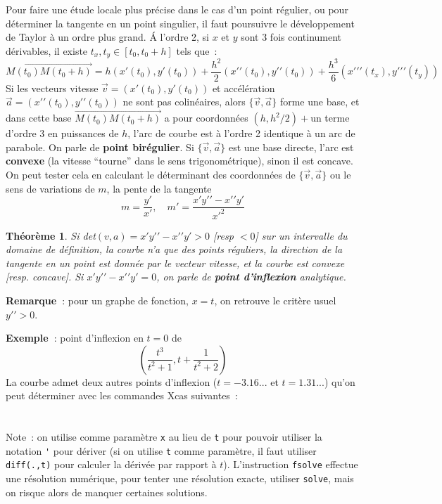 \documentclass[a4paper,11pt]{article}
\newtheorem{thm}{Théorème}
\begin{document}
\begin{giacjshere}
Pour faire une \'etude locale plus pr\'ecise dans le cas d'un point
r\'egulier, ou pour d\'eterminer la tangente en un point singulier,
il faut poursuivre le d\'eveloppement de Taylor \`a un ordre plus
grand. \'A l'ordre 2, si $x$ et $y$ sont 3 fois continument
d\'erivables, il existe $t_x,t_y\in [t_0,t_0+h]$ tels que~:
$$\overrightarrow{M(t_0)M(t_0+h)}= 
h (x'(t_0),y'(t_0))+\frac{h^2}{2}(x'{'}(t_0),y'{'}(t_0))
+\frac{h^3}{6}(x'{'}'(t_x),y'{'}'(t_y))
$$
Si les vecteurs vitesse $\overrightarrow{v}=(x'(t_0),y'(t_0))$
et acc\'el\'eration $\overrightarrow{a}=(x'{'}(t_0),y'{'}(t_0))$
ne sont pas colin\'eaires, 
alors $\{\overrightarrow{v},\overrightarrow{a}\}$ forme 
une base, et dans cette base $\overrightarrow{M(t_0)M(t_0+h)}$
a pour coordonn\'ees $(h,h^2/2)+$un terme d'ordre 3 en puissances de $h$, l'arc
de courbe est \`a l'ordre 2 identique \`a un arc de parabole. 
On parle de {\bf point bir\'egulier}.
Si $\{\overrightarrow{v},\overrightarrow{a}\}$ est une base directe,
l'arc est {\bf convexe} (la vitesse
``tourne'' dans le sens trigonom\'etrique),
sinon il est concave. On peut tester cela en calculant
le d\'eterminant des coordonn\'ees de 
$\{\overrightarrow{v},\overrightarrow{a}\}$ ou le sens
de variations de $m$, la pente de la tangente 
\[ m=\frac{y'}{x'}, \quad m'=\frac{x'y'{'}-x'{'}y'}{x'^2} \]

\begin{thm}
Si det$(v,a)=x'y'{'}-x'{'}y'>0$ [resp $<0$] 
sur un intervalle du domaine de d\'efinition,
la courbe n'a que des points r\'eguliers, 
la direction de la tangente en un point
est donn\'ee par le vecteur vitesse, et la courbe est convexe
[resp. concave].
Si $x'y'{'}-x'{'}y'=0$, on parle de 
{\bf point d'inflexion} analytique.
\end{thm}
{\bf Remarque~}: pour un graphe de fonction, $x=t$, on retrouve le
crit\`ere usuel $y'{'}>0$.

{\bf Exemple~}: point d'inflexion en $t=0$ de
$$ (\frac{t^3}{t^2+1},t+\frac{1}{t^2+2}) $$
La courbe admet deux autres points d'inflexion ($t=-3.16...$ et
$t=1.31...$) qu'on peut d\'eterminer avec les commandes Xcas suivantes~:\\
\\
\\
Note~: on utilise comme param\`etre \verb|x| au lieu de \verb|t| pour pouvoir 
utiliser la notation \verb|'| pour d\'eriver (si on utilise \verb|t|
comme param\`etre, il faut utiliser \verb|diff(.,t)| pour calculer
la d\'eriv\'ee par rapport \`a $t$). L'instruction \verb|fsolve|
effectue une r\'esolution num\'erique, pour tenter une r\'esolution
exacte, utiliser \verb|solve|, mais on risque alors de manquer
certaines solutions.


\end{giacjshere}
\end{document}
